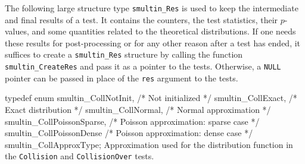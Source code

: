  The following large structure type {\tt smultin\_Res} is used to
 keep the intermediate and final results of a test.
 It contains the counters, the test statistics, their $p$-values,
 and some quantities related to the theoretical distributions.
 If one needs these results for post-processing or for any
 other reason after a test has ended, it suffices to create  a
 {\tt smultin\_Res} structure by calling the function
 {\tt smultin\_CreateRes}  and pass it as a pointer to the tests.
 Otherwise, a {\tt NULL} pointer can be passed in place of the {\tt res}
 argument to the tests.

\code

typedef enum {
   smultin_CollNotInit,           /* Not initialized */
   smultin_CollExact,             /* Exact distribution */
   smultin_CollNormal,            /* Normal approximation */
   smultin_CollPoissonSparse,     /* Poisson approximation: sparse case */
   smultin_CollPoissonDense       /* Poisson approximation: dense case */
} smultin_CollApproxType;
\endcode
  \tab
   Approximation used for the distribution function in the
       {\tt Collision} and  {\tt CollisionOver} tests.
  \endtab
\code


